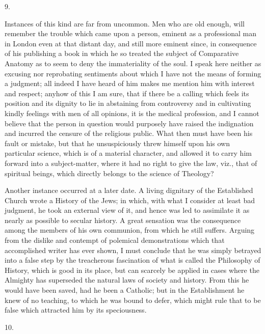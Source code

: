 9.

Instances of this kind are far from uncommon. Men who are old
enough, will remember the trouble which came upon a person, eminent as
a professional man in London even at that distant day, and still more
eminent since, in consequence of his publishing a book in which he so
treated the subject of Comparative Anatomy as to seem to deny the
immateriality of the soul. I speak here neither as excusing nor
reprobating sentiments about which I have not the means of forming a
judgment; all indeed I have heard of him makes me mention him with
interest and respect; anyhow of this I am sure, that if there be a
calling which feels its position and its dignity to lie in abstaining
from controversy and in cultivating kindly feelings with men of all
opinions, it is the medical profession, and I cannot believe that the
person in question would purposely have raised the indignation and
incurred the censure of the religious public. What then must have been
his fault or mistake, but that he unsuspiciously threw himself upon
his own particular science, which is of a material character, and
allowed it to carry him forward into a subject-matter, where it had no
right to give the law, viz., that of spiritual beings, which directly
belongs to the science of Theology?

Another instance occurred at a later date. A living dignitary of
the Established Church wrote a History of the Jews; in which, with
what I consider at least bad judgment, he took an external view of it,
and hence was led to assimilate it as nearly as possible to secular
history. A great sensation was the consequence among the members of
his own communion, from which he still suffers. Arguing from the
dislike and contempt of polemical demonstrations which that
accomplished writer has ever shown, I must conclude that he was simply
betrayed into a false step by the treacherous fascination of what is
called the Philosophy of History, which is good in its place, but can
scarcely be applied in cases where the Almighty has superseded the
natural laws of society and history. From this he would have been
saved, had he been a Catholic; but in the Establishment he knew of
no teaching, to which he was bound to defer, which might rule
that to be false which attracted him by its speciousness.

10.

